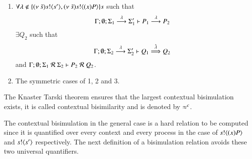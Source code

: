 \begin{definition}
\begin{enumerate}
		\item	$\forall \lambda \notin \{(\nu\ \tilde{s}) s ! \langle s' \rangle, (\nu\ \tilde{s}) s ! \langle (x)P \rangle\}s$ such that
			\[
				\Gamma; \emptyset; \Sigma_1 \stackrel{\lambda}{\longrightarrow} \Sigma_1' \vdash P_1 \stackrel{\lambda}{\longrightarrow} P_2
			\]
			$\exists Q_2$ such that 
			\[
				\Gamma; \emptyset; \Sigma_2 \stackrel{\lambda}{\longrightarrow} \Sigma_2' \vdash Q_1 \stackrel{\hat{\lambda}}{\Longrightarrow} Q_2
			\]
			and
			$\Gamma; \emptyset; \Sigma_1\ \mathcal{R}\ \Sigma_2 \proves P_2\ \mathcal{R}\ Q_2$.

		\item	The symmetric cases of 1, 2 and 3.
	\end{enumerate}
	The Knaster Tarski theorem ensures that the largest contextual bisimulation exists, it is called contextual bisimilarity and is denoted by $\approx^c$.
\end{definition}

The contextual bisimulation in the general case is a hard relation to be computed
since it is quantified over every context and every process in the case of 
$s ! \langle (x)P \rangle$ and $s ! \langle s' \rangle$ respectively. The next definition
of a bisimulation relation avoids these two universal quantifiers.


